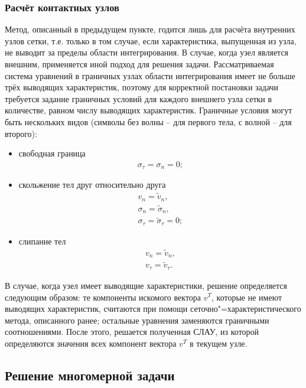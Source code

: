 
\subsubsection{Расчёт контактных узлов}

Метод, описанный в предыдущем пункте, годится лишь для расчёта внутренних узлов
сетки, т.е. только в том случае, если характеристика, выпущенная из узла, не
выводит за пределы области интегрирования. В случае, когда узел является
внешним, применяется иной подход для решения задачи. Рассматриваемая система
уравнений в граничных узлах области интегрирования имеет не больше трёх
\cite{chelnokov} выводящих характеристик, поэтому для корректной постановки
задачи требуется задание граничных условий для каждого внешнего узла сетки в
количестве, равном числу выводящих характеристик. Граничные условия могут быть
нескольких видов (символы без волны -- для первого тела, с волной -- для второго):
\begin{itemize}
\item{свободная граница
\begin{eqnarray}
\sigma_\tau=\sigma_n=0; \nonumber
\end{eqnarray}}
\item{скольжение тел друг относительно друга 
\begin{eqnarray}
v_n=\tilde{v}_n,\nonumber\\
\sigma_n=\tilde{\sigma}_n,\nonumber\\
\sigma_\tau=\tilde{\sigma}_\tau=0; \nonumber
\end{eqnarray}}
\item{слипание тел
\begin{eqnarray}
v_n=\tilde{v}_n,\nonumber\\
v_\tau=\tilde{v}_\tau.
\end{eqnarray}}
\end{itemize}
В случае, когда узел имеет выводящие характеристики, решение определяется
следующим образом: те компоненты искомого вектора $v^T$, которые не имеют
выводящих характеристик, считаются при помощи сеточно"=характеристического
метода, описанного ранее; остальные уравнения заменяются граничными
соотношениями. После этого, решается полученная СЛАУ, из которой определяются
значения всех компонент вектора $v^T$ в текущем узле.


\subsection{Решение многомерной задачи}

